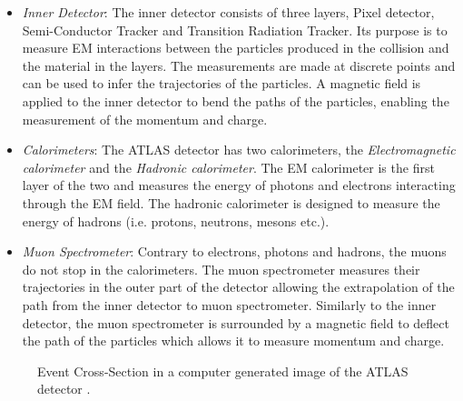 \begin{itemize}
    \item \emph{Inner Detector}: The inner detector consists of three layers, Pixel detector, Semi-Conductor Tracker 
          and Transition Radiation Tracker. Its purpose is to measure \ac{EM} interactions between the particles 
          produced in the collision and the material in the layers. The measurements are made at discrete points and can be 
          used to infer the trajectories of the particles. A magnetic field is applied to the inner detector
          to bend the paths of the particles, enabling the measurement of the momentum and charge.  
    \item \emph{Calorimeters}: The \ac{ATLAS} detector has two calorimeters, the \emph{Electromagnetic calorimeter} and the 
           \emph{Hadronic calorimeter}. The \ac{EM} calorimeter is the first layer of the two and measures the energy of 
           photons and electrons interacting through the \ac{EM} field. The hadronic calorimeter is designed to measure the energy of 
           hadrons (i.e. protons, neutrons, mesons etc.).
    \item \emph{Muon Spectrometer}: Contrary to electrons, photons and hadrons, the muons do not stop in the calorimeters.
            The muon spectrometer measures their trajectories in the outer part of the detector allowing the extrapolation of
            the path from the inner detector to muon spectrometer. Similarly to the inner detector, the muon spectrometer 
            is surrounded by a magnetic field to deflect the path of the particles which allows it to measure momentum and charge. 
\end{itemize}
\begin{figure}
    \centering
    \caption[Event Cross Section in a computer generated image of the
    \acs{ATLAS} detector.]{Event Cross-Section in a computer generated image of the
    ATLAS detector \cite{PDetector}.}
    \label{fig:detector}
\end{figure}

